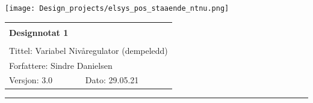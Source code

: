 \documentclass[a4paper,11pt,norsk]{article}
\begin{document}
\begin{minipage}[c]{0.15\textwidth}
\texttt{[image: Design\_projects/elsys\_pos\_staaende\_ntnu.png]}
\end{minipage}
\begin{minipage}[c]{0.85\textwidth}

\renewcommand{\arraystretch}{1.7}
\large 
\begin{tabularx}{\textwidth}{|X|X|}
\hline
\multicolumn{2}{|l|}{} \\
\multicolumn{2}{|l|}{\huge \textbf{Designnotat 1}} \\
\multicolumn{2}{|l|}{}  \\
\hline
\multicolumn{2}{|l|}{Tittel: 
Variabel Nivåregulator (dempeledd)
} \\
\hline
\multicolumn{2}{|l|}{Forfattere: 
Sindre Danielsen
} \\
\hline
Versjon: 3.0 & Dato: 29.05.21
\\
\hline 
\end{tabularx}
\end{minipage}
\normalsize


\setlength{\parskip}{0ex}
\renewcommand{\baselinestretch}{0.1}\normalsize
\tableofcontents
\renewcommand{\baselinestretch}{1.00}\normalsize
\setlength{\parskip}{2ex}
\rule{\textwidth}{1pt}

\newpage
\end{document}
